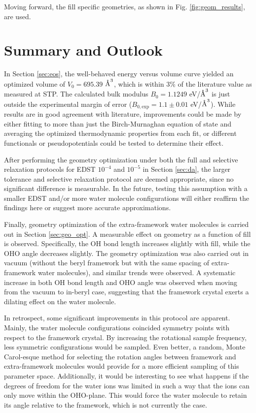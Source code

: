         Moving forward, the fill specific geometries, as shown in Fig. \ref{fig:geom_results}, are used. 
        
    \section{Summary and Outlook}
    
    In Section \ref{sec:eos}, the well-behaved energy versus volume curve yielded an optimized volume of $V_0 = 695.39$ $\text{\normalfont\AA}^3$, which is within 3\% of the literature value as measured at STP. The calculated bulk modulus $B_0 = 1.1249$ eV/$\text{\normalfont\AA}^3$ is just outside the experimental margin of error ($B_{0,\text{exp}} = 1.1 \pm 0.01$ eV/$\text{\normalfont\AA}^3$). While results are in good agreement with literature, improvements could be made by either fitting to more than just the Birch-Murnaghan equation of state and averaging the optimized thermodynamic properties from each fit, or different functionals or pseudopotentials could be tested to determine their effect. 
    
    After performing the geometry optimization under both the full and selective relaxation protocols for EDST $10^{-4}$ and $10^{-5}$ in Section \ref{sec:da}, the larger tolerance and selective relaxation protocol are deemed appropriate, since no significant difference is measurable. In the future, testing this assumption with a smaller EDST and/or more water molecule configurations will either reaffirm the findings here or suggest more accurate approximations.
    
    Finally, geometry optimization of the extra-framework water molecules is carried out in Section \ref{sec:geo_opt}. A measurable effect on geometry as a function of fill is observed. Specifically, the OH bond length increases slightly with fill, while the OHO angle decreases slightly. The geometry optimization was also carried out in vacuum (without the beryl framework but with the same spacing of extra-framework water molecules), and similar trends were observed. A systematic increase in both OH bond length and OHO angle was observed when moving from the vacuum to in-beryl case, suggesting that the framework crystal exerts a dilating effect on the water molecule.
    
    In retrospect, some significant improvements in this protocol are apparent. Mainly, the water molecule configurations coincided symmetry points with respect to the framework crystal. By increasing the rotational sample frequency, less symmetric configurations would be sampled. Even better, a random, Monte Carol-esque method for selecting the rotation angles between framework and extra-framework molecules would provide for a more efficient sampling of this parameter space. Additionally, it would be interesting to see what happens if the degrees of freedom for the water ions was limited in such a way that the ions can only move within the OHO-plane. This would force the water molecule to retain its angle relative to the framework, which is not currently the case.
        
